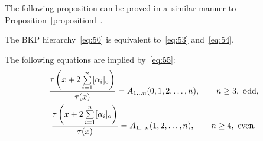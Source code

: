 \documentclass[pdftex]{sigma}
\begin{document}
The following proposition can be proved in a~similar manner to Proposition~\ref{proposition1}.
\begin{proposition}\label{proposition7}
The BKP hierarchy~\eqref{eq:50} is equivalent to~\eqref{eq:53} and~\eqref{eq:54}.
\end{proposition}
\begin{proposition}\label{proposition8}
The following equations are implied by~\eqref{eq:55}:
\begin{gather}
\frac{\tau\left(x+2\sum\limits_{i=1}^{n}[\alpha_i]_{\rm o}\right)}{\tau(x)}=A_{1\dots n}(0,1,2,\dots,n),\qquad n\ge3, \ \text{odd},
\label{eq:66}
\\
\frac{\tau\left(x+2\sum\limits_{i=1}^{n}[\alpha_i]_{\rm o}\right)}{\tau(x)}=A_{1\dots n}(1,2,\dots,n),\qquad n\ge4, \ \text{even}.
\label{eq:67}
\end{gather}
\end{proposition}
\end{document}
